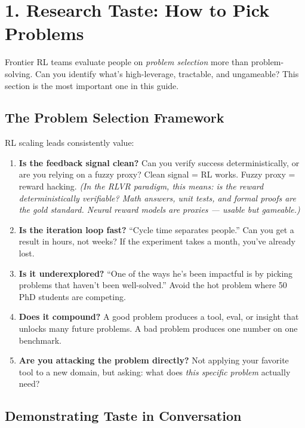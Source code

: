 \section{1. Research Taste: How to Pick Problems}

\begin{bluf}
Frontier RL teams evaluate people on \textit{problem selection} more than problem-solving. Can you identify what's high-leverage, tractable, and ungameable? This section is the most important one in this guide.
\end{bluf}

\subsection{The Problem Selection Framework}

RL scaling leads consistently value:

\begin{enumerate}
  \item \textbf{Is the feedback signal clean?} Can you verify success deterministically, or are you relying on a fuzzy proxy? Clean signal = RL works. Fuzzy proxy = reward hacking. \textit{(In the RLVR paradigm, this means: is the reward deterministically verifiable? Math answers, unit tests, and formal proofs are the gold standard. Neural reward models are proxies --- usable but gameable.)}
  \item \textbf{Is the iteration loop fast?} ``Cycle time separates people.'' Can you get a result in hours, not weeks? If the experiment takes a month, you've already lost.
  \item \textbf{Is it underexplored?} ``One of the ways he's been impactful is by picking problems that haven't been well-solved.'' Avoid the hot problem where 50 PhD students are competing.
  \item \textbf{Does it compound?} A good problem produces a tool, eval, or insight that unlocks many future problems. A bad problem produces one number on one benchmark.
  \item \textbf{Are you attacking the problem directly?} Not applying your favorite tool to a new domain, but asking: what does \textit{this specific problem} actually need?
\end{enumerate}

\subsection{Demonstrating Taste in Conversation}

